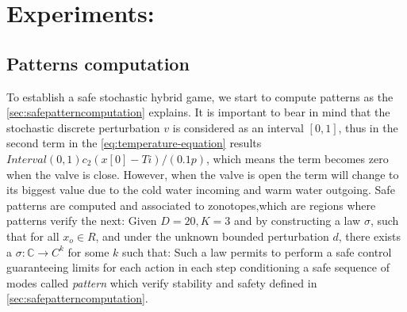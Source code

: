   \section{Experiments: }
    \subsection{Patterns computation}
      To establish a safe stochastic hybrid game,
      we start to compute patterns as the \autoref{sec:safepatterncomputation} 
      explains. It is important to bear in mind that the stochastic discrete
      perturbation $v$ is considered as an interval $[0,1]$, thus in the second term
      in the \autoref{eq:temperature-equation} results $Interval(0,1)c_2(x[0]-Ti)/(0.1p)$,
      which means the term becomes zero when the valve is close. However, 
      when the valve is open the term will change to its biggest value due to
      the cold water incoming and warm water outgoing. Safe patterns are 
      computed and associated to zonotopes,which are regions where patterns
      verify the next: Given $D = 20, K = 3$ and by constructing a law 
      $\sigma$, such that for all $x_o \in R$, and under the unknown 
      bounded perturbation $d$, there exists a $ \sigma: \mathbb{C} \rightarrow C^k$ for      
      some $k$ such that:      
      Such a law permits to perform a safe control guaranteeing limits for each
      action in each step conditioning a safe sequence of modes called 
      \emph{pattern} which verify stability and safety defined in
       \autoref{sec:safepatterncomputation}.



